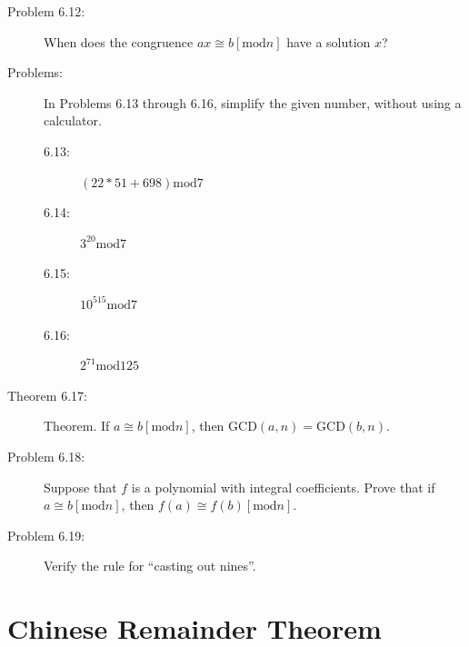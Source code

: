 \documentclass{article}
\begin{document}
\begin{description}
  \item[Problem 6.12:] When does the congruence $ax \cong b [\text{mod} n]$ have a solution $x$?

  \item[Problems:] In Problems 6.13 through 6.16, simplify the given number, without using a calculator.
    \begin{description}
      \item[6.13:] $(22*51+698) \text{mod} 7$
      \item[6.14:] $3^20 \text{mod} 7$
      \item[6.15:] $10^515 \text{mod} 7$
      \item[6.16:] $2^71 \text{mod} 125$
    \end{description}

  \item[Theorem 6.17:] Theorem. If $a \cong b [\text{mod} n]$, then $\text{GCD}(a,n) = \text{GCD}(b,n)$.

  \item[Problem 6.18:] Suppose that $f$ is a polynomial with integral coefficients. Prove that if $a \cong b [\text{mod} n]$, then $f(a) \cong f(b) [\text{mod} n]$.

  \item[Problem 6.19:] Verify the rule for ``casting out nines''.

\end{description}


\section{Chinese Remainder Theorem}
\end{document}
